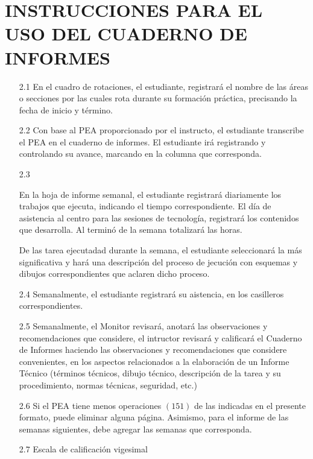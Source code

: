 \section{\normalsize{INSTRUCCIONES PARA EL USO DEL CUADERNO DE INFORMES}}
\begin{itemize}
\item [2.1] {En el cuadro de rotaciones, el estudiante, registrará el nombre de las áreas o secciones
            por las cuales rota durante su formación práctica, precisando la fecha de inicio y término.}
\item [2.2] {Con base al PEA proporcionado por el instructo, el estudiante transcribe el PEA en el 
            cuaderno de informes. El estudiante irá registrando y controlando su avance, marcando en la
            columna que corresponda.}
\item [2.3] {En la hoja de informe semanal, el estudiante registrará diariamente los trabajos que ejecuta,
            indicando el tiempo correspondiente. El día de asistencia al centro para las sesiones de tecnología,
            registrará los contenidos que desarrolla. Al terminó de la semana totalizará las horas.
            
            De las tarea ejecutadad durante la semana, el estudiante seleccionará la más
            significativa y hará una descripción del proceso de jecución con esquemas y dibujos
            correspondientes que aclaren dicho proceso.}
\item [2.4] {Semanalmente, el estudiante registrará su aistencia, en los casilleros correspondientes.}
\item [2.5] {Semanalmente, el Monitor revisará, anotará las observaciones y recomendaciones que considere, el 
            intructor revisará y calificará el Cuaderno de Informes haciendo las observaciones y recomendaciones
            que considere convenientes, en los aspectos relacionados a la elaboración de un Informe Técnico (términos
            técnicos, dibujo técnico, descripción de la tarea y su procedimiento, normas técnicas, seguridad, etc.)}
\item [2.6] {Si el PEA tiene menos operaciones $(151)$ de las indicadas en el presente formato, puede eliminar alguna
            página. Asimismo, para el informe de las semanas siguientes, debe agregar las semanas que corresponda.}
\item [2.7] {Escala de calificación vigesimal}
\end {itemize}

